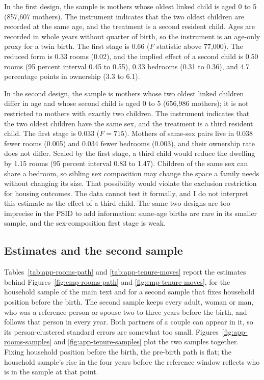 In the first design, the sample is mothers whose oldest linked child is aged 0
to 5 (857,607 mothers). The instrument indicates that the two oldest children
are recorded at the same age, and the treatment is a second resident child.
Ages are recorded in whole years without quarter of birth, so the instrument
is an age-only proxy for a twin birth. The first stage is 0.66 ($F$ statistic
above 77,000). The reduced form is 0.33 rooms (0.02), and the implied effect of
a second child is 0.50 rooms (95 percent interval 0.45 to 0.55), 0.33 bedrooms
(0.31 to 0.36), and 4.7 percentage points in ownership (3.3 to 6.1).

In the second design, the sample is mothers whose two oldest linked children
differ in age and whose second child is aged 0 to 5 (656,986 mothers); it is
not restricted to mothers with exactly two children. The instrument indicates
that the two oldest children have the same sex, and the treatment is a third
resident child. The first stage is 0.033 ($F=715$). Mothers of same-sex pairs
live in 0.038 fewer rooms (0.005) and 0.034 fewer bedrooms (0.003), and their
ownership rate does not differ. Scaled by the first stage, a third child would
reduce the dwelling by 1.15 rooms (95 percent interval 0.83 to 1.47). Children of the same sex can
share a bedroom, so sibling sex composition may change the space a family
needs without changing its size. That possibility would violate the exclusion
restriction for housing outcomes. The data cannot test it formally, and I do
not interpret this estimate as the effect of a third child. The same two designs are too imprecise in the PSID to add
information: same-age births are rare in its smaller sample, and the
sex-composition first stage is weak.

\subsection{Estimates and the second sample}
\label{app:empirical-two-samples}

Tables~\ref{tab:app-rooms-path} and \ref{tab:app-tenure-moves} report the
estimates behind Figures~\ref{fig:emp-rooms-path} and
\ref{fig:emp-tenure-moves}, for the household sample of the main text and for
a second sample that fixes household position before the birth. The second
sample keeps every adult, woman or man, who was a reference person or spouse
two to three years before the birth, and follows that person in every year.
Both partners of a couple can appear in it, so its person-clustered standard
errors are somewhat too small. Figures~\ref{fig:app-rooms-samples} and
\ref{fig:app-tenure-samples} plot the two samples together. Fixing household
position before the birth, the pre-birth path is flat; the household sample's
rise in the four years before the reference window reflects who is in the
sample at that point.

